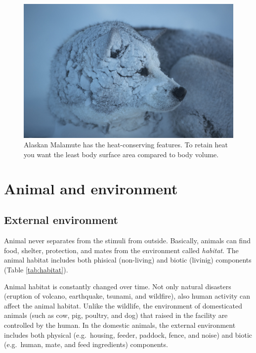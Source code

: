 \documentclass[]{book}
\begin{document}
\begin{figure}

{\centering \includegraphics[width=1\linewidth]{figures/polar} 

}

\caption{Alaskan Malamute has the heat-conserving features. To retain heat you want the least body surface area compared to body volume.}\label{fig:snow-dog}
\end{figure}

\hypertarget{chapter2}{%
\chapter{Animal and environment}\label{chapter2}}

\hypertarget{external-environment}{%
\section{External environment}\label{external-environment}}

Animal never separates from the stimuli from outside. Basically, animals can find food, shelter, protection, and mates from the environment called \emph{habitat}. The animal habitat includes both phisical (non-living) and biotic (livinig) components (Table \ref{tab:habitat}).

Animal habitat is constantly changed over time. Not only natural disasters (eruption of volcano, earthquake, tsunami, and wildfire), also human activity can affect the animal habitat. Unlike the wildlife, the environment of domesticated animals (such as cow, pig, poultry, and dog) that raised in the facility are controlled by the human. In the domestic animals, the external environment includes both physical (e.g.~housing, feeder, paddock, fence, and noise) and biotic (e.g.~human, mate, and feed ingredients) components.
\end{document}
